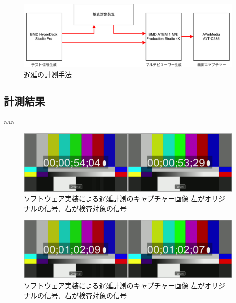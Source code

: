 \begin{figure}[htbp]
  \begin{center}
    \includegraphics[bb=0 0 697 212,width=15cm]{img/evaluate-diagram.pdf}
  \end{center}
  \caption{遅延の計測手法}
  \label{fig:evaluate-diagram}
\end{figure}

\subsection{計測結果}

aaa

\begin{figure}[htbp]
  \begin{center}
    \includegraphics[bb=0 0 1920 540,width=14cm]{img/evaluate-delay-software-1.png}
  \end{center}
  \caption[ソフトウェア実装による遅延計測のキャプチャー画像]{ソフトウェア実装による遅延計測のキャプチャー画像 左がオリジナルの信号、右が検査対象の信号}
  \label{fig:evaluate-delay-software-1}
\end{figure}

\begin{figure}[htbp]
  \begin{center}
    \includegraphics[bb=0 0 1920 540,width=14cm]{img/evaluate-delay-software-2.png}
  \end{center}
  \caption[ソフトウェア実装による遅延計測のキャプチャー画像]{ソフトウェア実装による遅延計測のキャプチャー画像 左がオリジナルの信号、右が検査対象の信号}
  \label{fig:evaluate-delay-software-2}
\end{figure}

